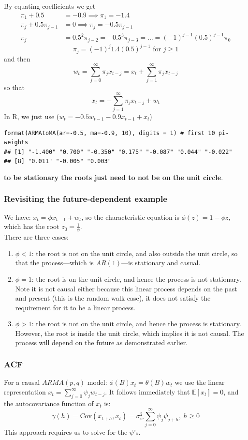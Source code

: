 \documentclass[11pt]{article}
\newcommand{\noi}{\noindent}
\begin{document}
\noi By equating coefficients we get
\begin{align*}
    \pi_1 + 0.5 &= -0.9 \implies \pi_1 = -1.4 \\
    \pi_j + 0.5\pi_{j-1} &= 0 \implies \pi_j = -0.5\pi_{j-1} \\
    \pi_j &= 0.5^2\pi_{j-2} = -0.5^3\pi_{j-3} = ... = (-1)^{j-1}(0.5)^{j-1}\pi_0
\end{align*}
$$\pi_j = (-1)^j1.4(0.5)^{j-1} \text{ for } j \geq 1$$
\noi and then
$$w_t = \sum_{j=0}^{\infty}{\pi_jx_{t-j}} = x_t + \sum_{j=1}^{\infty}{\pi_j x_{t-j}}$$
\noi so that
$$x_t = -\sum_{j=1}^{\infty}{\pi_jx_{t-j}} + w_t$$
\noi In R, we just use ($w_t = -0.5w_{t-1} - 0.9x_{t-1} + x_t$)
\begin{lstlisting}
format(ARMAtoMA(ar=-0.5, ma=-0.9, 10), digits = 1) # first 10 pi-weights
## [1] "-1.400" "0.700" "-0.350" "0.175" "-0.087" "0.044" "-0.022"
## [8] "0.011" "-0.005" "0.003"
\end{lstlisting}

\noi \textbf{to be stationary the roots just need to not be on the unit circle}.

\subsubsection*{Revisiting the future-dependent example}
\noi We have: $x_t = \phi x_{t-1} + w_t$, so the characteristic equation is $\phi(z) = 1 - \phi z$, which has the root $z_0 = \frac{1}{\phi}$. \\

\noi There are three cases:
\begin{enumerate}
    \item $\phi < 1$: the root is not on the unit circle, and also outside the unit circle, so that the process---which is $AR(1)$---is stationary and casual.
    \item $\phi = 1$: the root is on the unit circle, and hence the process is not stationary. Note it is not causal either because this linear process depends on the past and present (this is the random walk case), it does not satisfy the requirement for it to be a linear process.
    \item $\phi > 1$: the root is not on the unit circle, and hence the process is stationary. However, the root is inside the unit circle, which implies it is not causal. The process will depend on the future as demonstrated earlier.
\end{enumerate}

\subsubsection{ACF}
\noi For a causal $ARMA(p,q)$ model: $\phi(B)x_t = \theta(B)w_t$ we use the linear representation $x_t = \sum_{j=0}^{\infty}\psi_jw_{t-j}$. It follows immediately that $\mathbb{E}[x_t] = 0$, and the autocovariance function of $x_t$ is:
$$\gamma(h) = \text{Cov}(x_{t+h}, x_t) = \sigma_w^2\sum_{j=0}^{\infty}{\psi_j\psi_{j+h}}, \: h \geq 0$$
\noi This approach requires us to solve for the $\psi$'s. \\
\end{document}

